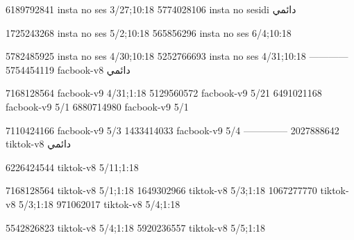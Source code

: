 
6189792841 insta no ses
3/27;10:18
5774028106 insta no sesidi
دائمي


1725243268 insta no ses
5/2;10:18
565856296 insta no ses
6/4;10:18

5782485925 insta no ses
4/30;10:18
5252766693 insta no ses
4/31;10:18
------------
5754454119 facbook-v8
دائمي

7168128564 facbook-v9
4/31;1:18
5129560572 facbook-v9
5/21
6491021168 facbook-v9
5/1
6880714980 facbook-v9
5/1

7110424166 facbook-v9
5/3
1433414033 facbook-v9
5/4
--------------
2027888642 tiktok-v8
دائمي

6226424544 tiktok-v8
5/11;1:18

7168128564 tiktok-v8
5/1;1:18
1649302966 tiktok-v8
5/3;1:18
1067277770 tiktok-v8
5/3;1:18
971062017 tiktok-v8
5/4;1:18

5542826823 tiktok-v8
5/4;1:18
5920236557 tiktok-v8
5/5;1:18

